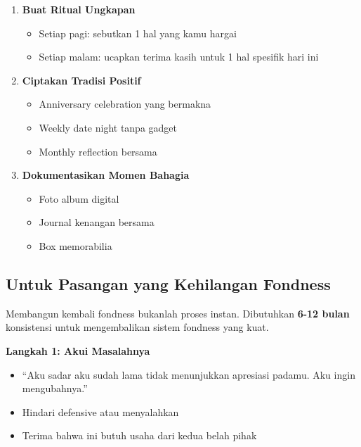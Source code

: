 \begin{tipbox}
\begin{enumerate}
    \item \textbf{Buat Ritual Ungkapan}
    \begin{itemize}
        \item Setiap pagi: sebutkan 1 hal yang kamu hargai
        \item Setiap malam: ucapkan terima kasih untuk 1 hal spesifik hari ini
    \end{itemize}
    \item \textbf{Ciptakan Tradisi Positif}
    \begin{itemize}
        \item Anniversary celebration yang bermakna
        \item Weekly date night tanpa gadget
        \item Monthly reflection bersama
    \end{itemize}
    \item \textbf{Dokumentasikan Momen Bahagia}
    \begin{itemize}
        \item Foto album digital
        \item Journal kenangan bersama
        \item Box memorabilia
    \end{itemize}
\end{enumerate}
\end{tipbox}

\subsection{Untuk Pasangan yang Kehilangan Fondness}

\begin{warningbox}
Membangun kembali fondness bukanlah proses instan. Dibutuhkan \textbf{6-12 bulan} konsistensi untuk mengembalikan sistem fondness yang kuat.
\end{warningbox}

\textbf{Langkah 1: Akui Masalahnya}
\begin{itemize}
    \item ``Aku sadar aku sudah lama tidak menunjukkan apresiasi padamu. Aku ingin mengubahnya.''
    \item Hindari defensive atau menyalahkan
    \item Terima bahwa ini butuh usaha dari kedua belah pihak
\end{itemize}

